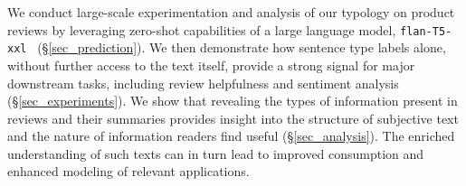 We conduct large-scale experimentation and analysis of our typology on product reviews by leveraging zero-shot capabilities of a large language model, \texttt{flan-T5-xxl}~\citep{wei2022flan} (\S{\ref{sec_prediction}}).
We then demonstrate how sentence type labels alone, without further access to the text itself, provide a strong signal for major downstream tasks, including review helpfulness and sentiment analysis (\S{\ref{sec_experiments}}).
We show that revealing the types of information present in reviews and their summaries provides 
insight into the structure of subjective text and the nature of information readers find useful (\S{\ref{sec_analysis}}).
The enriched understanding of such texts can in turn lead to improved consumption and enhanced modeling of relevant applications.





